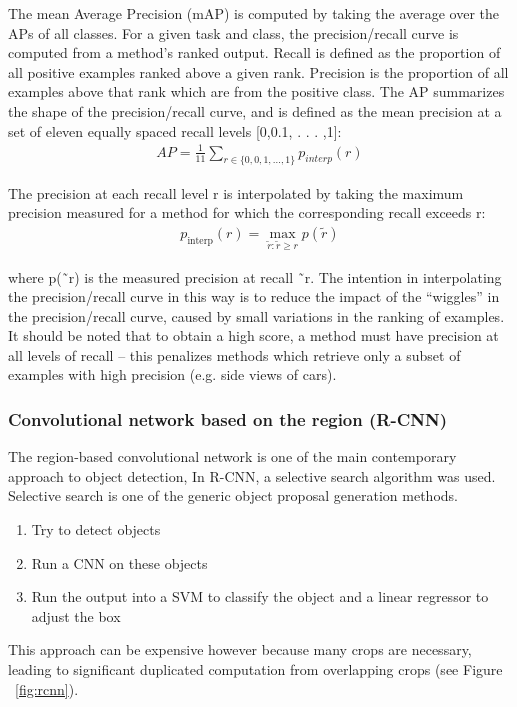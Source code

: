 \begin{it}
The mean Average Precision (mAP) is computed by taking the average over the APs of all classes.
For a given task and class, the precision/recall curve is computed from a method’s ranked output. Recall is defined as the proportion of all positive examples ranked above a given rank. Precision is the proportion of all examples above that rank which are from the positive class. The AP summarizes the shape of the precision/recall curve, and is defined as the mean precision at a set of eleven equally spaced recall levels [0,0.1, . . . ,1]:
\begin{gather*}
    A P=\frac{1}{11} \sum_{r \in\{0,0,1, \ldots, 1\}} p_{i n t e r p}(r)
\end{gather*}

The precision at each recall level r is interpolated by taking the maximum precision measured for a method for which the corresponding recall exceeds r:
\begin{gather*}
    p_{\text {interp}}(r)=\max _{\tilde{r} : \tilde{r} \geq r} p(\tilde{r})
\end{gather*}

where p(˜r) is the measured precision at recall ˜r. The intention in interpolating the precision/recall curve in this way is to reduce the impact of the “wiggles” in the precision/recall curve, caused by small variations in the ranking of examples. It should be noted that to obtain a high score, a method must have precision at all levels of recall – this penalizes methods which retrieve only a subset of examples with high precision (e.g. side views of cars).
\end{it}



\pagebreak\subsubsection{Convolutional network based on the region (R-CNN)}
The region-based convolutional network is one of the main contemporary approach to object detection,
In R-CNN\cite{rcnn}, a selective search algorithm was used. Selective search is one of the generic object proposal generation methods.
\begin{enumerate}
    \item Try to detect objects
    \item Run a CNN on these objects
    \item Run the output into a SVM to classify the object and a linear regressor to adjust the box
\end{enumerate}
This approach can be expensive however because many crops are necessary, leading to significant duplicated computation from overlapping crops (see Figure ~\ref{fig:rcnn}).

